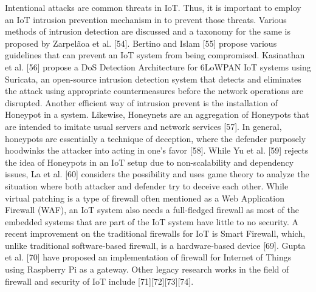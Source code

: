 Intentional attacks are common threats in IoT. Thus, it is important to employ an IoT intrusion prevention mechanism in to prevent those threats. Various methods of intrusion detection are discussed and a taxonomy for the same is proposed by Zarpelãoa et al. [54]. Bertino and Islam [55] propose various guidelines that can prevent an IoT system from being compromised. Kasinathan et al. [56] propose a DoS Detection Architecture for 6LoWPAN IoT systems using Suricata, an open-source intrusion detection system that detects and eliminates the attack using appropriate countermeasures before the network operations are disrupted. Another efficient way of intrusion prevent is the installation of Honeypot in a system. Likewise, Honeynets are an aggregation of Honeypots that are intended to imitate usual servers and network services [57]. In general, honeypots are essentially a technique of deception, where the defender purposely hoodwinks the attacker into acting in one’s favor [58]. While Yu et al. [59] rejects the idea of Honeypots in an IoT setup due to non-scalability and dependency issues, La et al. [60] considers the possibility and uses game theory to analyze the situation where both attacker and defender try to deceive each other. 
While virtual patching is a type of firewall often mentioned as a Web Application Firewall (WAF), an IoT system also needs a full-fledged firewall as most of the embedded systems that are part of the IoT system have little to no security. A recent improvement on the traditional firewalls for IoT is Smart Firewall, which, unlike traditional software-based firewall, is a hardware-based device [69]. Gupta et al. [70] have proposed an implementation of firewall for Internet of Things using Raspberry Pi as  a gateway. Other legacy research works in the field of firewall and security of IoT include [71][72][73][74].
